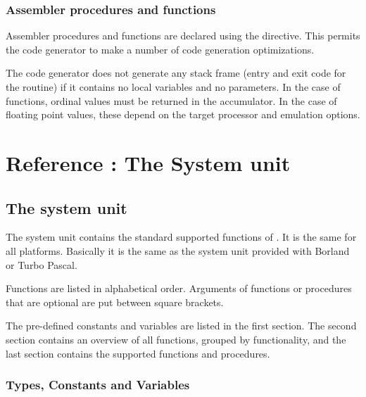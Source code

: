\section{Assembler procedures and functions}
Assembler procedures and functions are declared using the
 directive.  This permits the code generator to make a number
of code generation optimizations.

The code generator does not generate any stack frame (entry and exit
code for the routine) if it contains no local variables and no
parameters. In the case of functions, ordinal values must be returned
in the accumulator. In the case of floating point values, these depend
on the target processor and emulation options.

%
%

\part{Reference : The System unit}

\chapter{The system unit}
\label{ch:refchapter}
The system unit contains the standard supported functions of \fpc. It is the
same for all platforms. Basically it is the same as the system unit provided
with Borland or Turbo Pascal.

Functions are listed in alphabetical order. Arguments of functions or
procedures that are optional are put between square brackets.

The pre-defined constants and variables are listed in the first section.
The second section contains an overview of all functions, grouped by
functionality, and the last section contains the supported functions
and procedures.

\section{Types, Constants and Variables}

